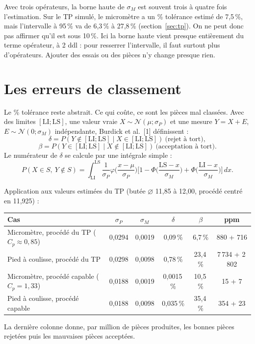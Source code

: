 \documentclass[11pt,a4paper]{article}
\theoremstyle{sj}
\theoremstyle{definition}
\theoremstyle{remark}
\newcommand{\N}{\mathcal{N}}
\begin{document}
\begin{essentiel}
Avec trois opérateurs, la borne haute de $\sigma_M$ est souvent trois à quatre fois l'estimation. Sur le TP simulé, le micromètre a un \% tolérance estimé de 7,5\,\%, mais l'intervalle à 95\,\% va de 6,3\,\% à 27,8\,\% (section~\ref{sec:tp}). On ne peut donc pas affirmer qu'il est sous 10\,\%. Ici la borne haute vient presque entièrement du terme opérateur, à 2 ddl : pour resserrer l'intervalle, il faut surtout plus d'opérateurs. Ajouter des essais ou des pièces n'y change presque rien.
\end{essentiel}

\section{Les erreurs de classement}\label{sec:classement}

Le \% tolérance reste abstrait. Ce qui coûte, ce sont les pièces mal classées. Avec des limites $[\mathrm{LI};\mathrm{LS}]$, une valeur vraie $X\sim\N(\mu;\sigma_P)$ et une mesure $Y=X+E$, $E\sim\N(0;\sigma_M)$ indépendante, Burdick et al.~[1] définissent :
\[
\delta=P(Y\notin[\mathrm{LI};\mathrm{LS}]\mid X\in[\mathrm{LI};\mathrm{LS}])\ \text{(rejet à tort)},
\]
\[
\beta=P(Y\in[\mathrm{LI};\mathrm{LS}]\mid X\notin[\mathrm{LI};\mathrm{LS}])\ \text{(acceptation à tort)}.
\]
Le numérateur de $\delta$ se calcule par une intégrale simple :
\[
P(X\in S,\ Y\notin S)=\int_{\mathrm{LI}}^{\mathrm{LS}}\frac{1}{\sigma_P}\varphi\Big(\frac{x-\mu}{\sigma_P}\Big)\Big[1-\Phi\Big(\frac{\mathrm{LS}-x}{\sigma_M}\Big)+\Phi\Big(\frac{\mathrm{LI}-x}{\sigma_M}\Big)\Big]\,dx.
\]

Application aux valeurs estimées du TP (butée $\varnothing$ 11,85 à 12,00, procédé centré en 11,925) :
\begin{center}
\small
\begin{tabular}{p{4.6cm} c c c c c}
\toprule
Cas & $\sigma_P$ & $\sigma_M$ & $\delta$ & $\beta$ & ppm\\
\midrule
Micromètre, procédé du TP ($C_p\approx0{,}85$) & 0,0294 & 0,0019 & 0,09\,\% & 6,7\,\% & 880 + 716\\
Pied à coulisse, procédé du TP & 0,0298 & 0,0098 & 0,78\,\% & 23,4\,\% & 7\,734 + 2\,802\\
Micromètre, procédé capable ($C_p=1{,}33$) & 0,0188 & 0,0019 & 0,0015\,\% & 10,5\,\% & 15 + 7\\
Pied à coulisse, procédé capable & 0,0188 & 0,0098 & 0,035\,\% & 35,4\,\% & 354 + 23\\
\bottomrule
\end{tabular}
\end{center}
La dernière colonne donne, par million de pièces produites, les bonnes pièces rejetées puis les mauvaises pièces acceptées.
\end{document}
